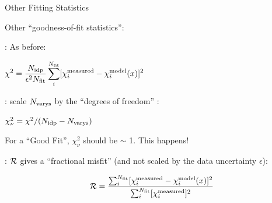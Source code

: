 \begin{slide}{Other Fitting Statistics}

  Other ``goodness-of-fit statistics'':
  \vmm

  {}: As before:

  \begin{postitbox}{54mm}  $ \displaystyle
    \chi^2  =  \frac{ N_{\rm idp}}{\epsilon^2 N_{\rm fit}}
    \sum_i^{N_{\rm fit}} [\chi_i^{\rm measured} - \chi_i^{\rm model}({x})]^2
    $
  \end{postitbox}

 \vmm
  {}: scale $N_{\rm varys}$ by the ``degrees of freedom'' :

  \begin{postitbox}{38mm}
    $ \chi^2_\nu =  \chi^2 / (N_{\rm idp}-N_{\rm varys}) $
  \end{postitbox}


  For a ``Good Fit'', $\chi^2_\nu$ should be $\sim$ 1.   This
  {} happens!

\vmm

  {}: $\cal{R}$  gives a ``fractional misfit'' (and
  not scaled by the data  uncertainty $\epsilon$):

\vmm

  \begin{postitbox}{50mm}
    \[
{\cal{R}} = \frac{\sum_i^{N_{\rm fit}}[\chi_i^{\rm measured} -
      \chi_i^{\rm model}({x})]^2 }{
      \sum_i^{N_{\rm fit}} [{\chi_i^{\rm measured}}]^2}
    \]
  \end{postitbox}

\vfill

\end{slide}



